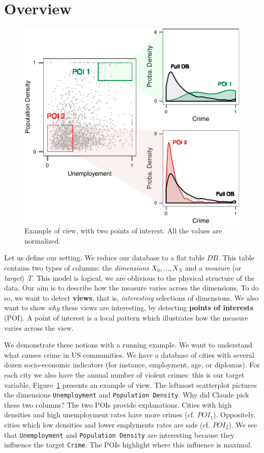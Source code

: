 \section{Overview}
\label{sec:presentation}
\begin{figure}[t!]
\centering
\includegraphics[width=0.8\columnwidth]{images/Overview}
\caption{Example of view, with two points of interest. All the values
are normalized.}
\label{fig:overview}
\end{figure}
Let us define our setting. We reduce our database to a flat table $DB$. This
table contains two types of columns: the \emph{dimensions} $X_0, \ldots, X_N$
and a \emph{measure} (or \emph{target})~$T$. This model is logical, we
are oblivious to the physical structure of the data. Our aim is to describe how
the measure varies across the dimensions. To do so, we want to detect
\textbf{views}, that is, \emph{interesting} selections of dimensions. We also
want to show \emph{why} these views are interesting, by detecting
\textbf{points of interests} (POI). A point of interest is a local pattern
which illustrates how the measure varies across the view.

We demonstrate these notions with a running example. We want to understand what
causes crime in US communities. We have a database of cities with several dozen
socio-economic indicators (for instance, employment, age, or diplomas). For
each city we also have the annual number of violent crimes: this is our target
variable. Figure~\ref{fig:overview} presents an example of view. The leftmost
scatterplot pictures the dimensions \texttt{Unemployment} and
\texttt{Population Density}. Why did Claude pick these two columns? The two
POIs provide explanations. Cities with high densities and high unemployment
rates have more crimes (cf. $POI_1$).  Oppositely, cities which low densities
and lower emplyments rates are safe (cf.  $POI_2$). We see that
\texttt{Unemployment} and \texttt{Population Density} are interesting because
they influence the target \texttt{Crime}.  The POIs highlight where this
influence is maximal.

